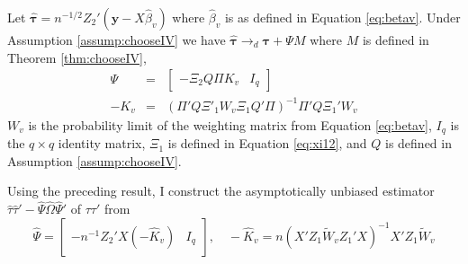 \begin{thm}
Let $\widehat{\boldsymbol{\tau}} = n^{-1/2} Z_2' ( \mathbf{y} - X\widehat{\beta}_v)$ where $\widehat{\beta}_v$ is as defined in Equation \ref{eq:betav}. Under Assumption \ref{assump:chooseIV} we have
$\widehat{\boldsymbol{\tau}} \rightarrow_d \boldsymbol{\tau} + \Psi M$
where $M$ is defined in Theorem \ref{thm:chooseIV},
\begin{eqnarray*}
	\Psi &=&\left[ \begin{array}{cc}-\Xi_2Q \Pi K_v  & I_{q} \end{array}\right] \\
	-K_v &=& \left(\Pi' Q \Xi'_1 W_v \Xi_1 Q'\Pi\right)^{-1} \Pi'Q \Xi_1' W_v
\end{eqnarray*}
$W_v$ is the probability limit of the weighting matrix from Equation \ref{eq:betav}, $I_q$ is the $q\times q$ identity matrix, $\Xi_1$ is defined in Equation \ref{eq:xi12},  and $Q$ is defined in Assumption \ref{assump:chooseIV}.
\end{thm}
Using the preceding result, I construct the asymptotically unbiased estimator $\widehat{\tau}\widehat{\tau}' - \widehat{\Psi}\widehat{\Omega} \widehat{\Psi}'$ of $\tau\tau'$ from
	$$\widehat{\Psi} = \left[ \begin{array}
		{cc}
		-n^{-1}Z_2'X \left(-\widehat{K}_v\right) & I_q
	\end{array}\right], \quad -\widehat{K}_v = n\left(X'Z_1 \widetilde{W}_v Z_1' X\right)^{-1}X'Z_1 \widetilde{W}_v$$

